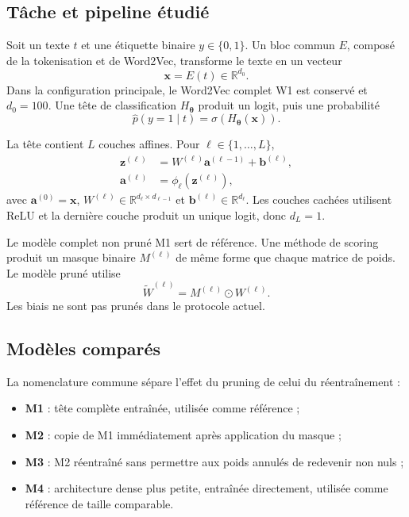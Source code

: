 \subsection{Tâche et pipeline étudié}
\label{ssec:probleme_pipeline}

Soit un texte $t$ et une étiquette binaire $y\in\{0,1\}$. Un bloc commun
$E$, composé de la tokenisation et de Word2Vec, transforme le texte en un
vecteur
\begin{equation}
    \boldsymbol{x}=E(t)\in\mathbb{R}^{d_0}.
\end{equation}
Dans la configuration principale, le Word2Vec complet W1 est conservé et
$d_0=100$. Une tête de classification $H_{\boldsymbol{\theta}}$ produit un
logit, puis une probabilité
\begin{equation}
    \widehat{p}(y=1\mid t)
    =\sigma\!\left(H_{\boldsymbol{\theta}}(\boldsymbol{x})\right).
\end{equation}

La tête contient $L$ couches affines. Pour
$\ell\in\{1,\ldots,L\}$,
\begin{align}
    \boldsymbol{z}^{(\ell)}
        &=W^{(\ell)}\boldsymbol{a}^{(\ell-1)}
          +\boldsymbol{b}^{(\ell)},\\
    \boldsymbol{a}^{(\ell)}
        &=\phi_{\ell}\!\left(\boldsymbol{z}^{(\ell)}\right),
\end{align}
avec $\boldsymbol{a}^{(0)}=\boldsymbol{x}$,
$W^{(\ell)}\in\mathbb{R}^{d_{\ell}\times d_{\ell-1}}$ et
$\boldsymbol{b}^{(\ell)}\in\mathbb{R}^{d_{\ell}}$. Les couches cachées
utilisent ReLU et la dernière couche produit un unique logit, donc $d_L=1$.

Le modèle complet non pruné M1 sert de référence. Une méthode de scoring
produit un masque binaire $M^{(\ell)}$ de même forme que chaque matrice de
poids. Le modèle pruné utilise
\begin{equation}
    \widetilde{W}^{(\ell)}
    =M^{(\ell)}\odot W^{(\ell)}.
\end{equation}
Les biais ne sont pas prunés dans le protocole actuel.

\subsection{Modèles comparés}
\label{ssec:probleme_modeles}

La nomenclature commune sépare l'effet du pruning de celui du
réentraînement :
\begin{itemize}
    \item \textbf{M1} : tête complète entraînée, utilisée comme référence ;
    \item \textbf{M2} : copie de M1 immédiatement après application du masque ;
    \item \textbf{M3} : M2 réentraîné sans permettre aux poids annulés de
    redevenir non nuls ;
    \item \textbf{M4} : architecture dense plus petite, entraînée directement,
    utilisée comme référence de taille comparable.
\end{itemize}

